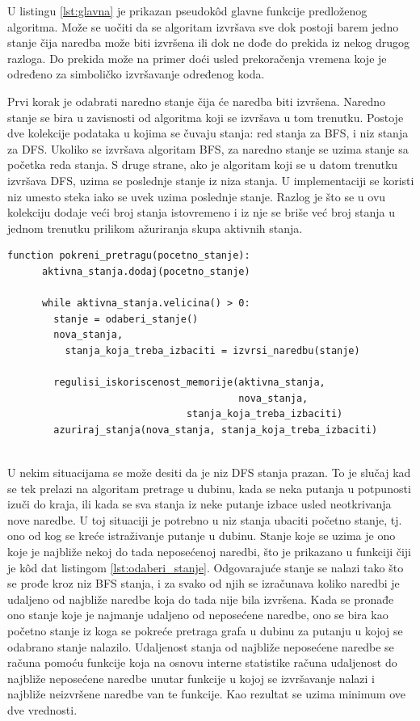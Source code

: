 \documentclass[12pt,oneside]{memoir}
\begin{document}
U listingu \ref{lst:glavna} je prikazan pseudok\^od glavne funkcije predloženog algoritma. Može se uočiti da se algoritam izvršava sve dok postoji barem jedno stanje čija naredba može biti izvršena ili dok ne dođe do prekida iz nekog drugog razloga. Do prekida može na primer doći usled prekoračenja vremena koje je određeno za simboličko izvršavanje određenog koda. 

Prvi korak je odabrati naredno stanje čija će naredba biti izvršena. Naredno stanje se bira u zavisnosti od algoritma koji se izvršava u tom trenutku. Postoje dve kolekcije podataka u kojima se čuvaju stanja: red stanja za BFS, i niz stanja za DFS. Ukoliko se izvršava algoritam BFS, za naredno stanje se uzima stanje sa početka reda stanja. S druge strane, ako je algoritam koji se u datom trenutku izvršava DFS, uzima se poslednje stanje iz niza stanja. U implementaciji se koristi niz umesto steka iako se uvek uzima poslednje stanje. Razlog je što se u ovu kolekciju dodaje veći broj stanja istovremeno i iz nje se briše već broj stanja u jednom trenutku prilikom ažuriranja skupa aktivnih stanja. 

  \begin{lstlisting}[caption={Pseudok\^od glavne funckije algoritma},captionpos=b,label={lst:glavna}]
    function pokreni_pretragu(pocetno_stanje):
      aktivna_stanja.dodaj(pocetno_stanje)
            
      while aktivna_stanja.velicina() > 0:
        stanje = odaberi_stanje()
        nova_stanja, 
          stanja_koja_treba_izbaciti = izvrsi_naredbu(stanje)
                
        regulisi_iskoriscenost_memorije(aktivna_stanja, 
                                        nova_stanja,
                               stanja_koja_treba_izbaciti)
        azuriraj_stanja(nova_stanja, stanja_koja_treba_izbaciti)
            
    \end{lstlisting}

U nekim situacijama se može desiti da je niz DFS stanja prazan. To je slučaj kad se tek prelazi na algoritam pretrage u dubinu, kada se neka putanja u potpunosti izuči do kraja, ili kada se sva stanja iz neke putanje izbace usled neotkrivanja nove naredbe. U toj situaciji je potrebno u niz stanja ubaciti početno stanje, tj. ono od kog se kreće istraživanje putanje u dubinu. Stanje koje se uzima je ono koje je najbliže nekoj do tada neposećenoj naredbi, što je prikazano u funkciji čiji je k\^od dat listingom \ref{lst:odaberi_stanje}. Odgovarajuće stanje se nalazi tako što se prođe kroz niz BFS stanja, i za svako od njih se izračunava koliko naredbi je udaljeno od najbliže naredbe koja do tada nije bila izvršena. Kada se pronađe ono stanje koje je najmanje udaljeno od neposećene naredbe, ono se bira kao početno stanje iz koga se pokreće pretraga grafa u dubinu za putanju u kojoj se odabrano stanje nalazilo. Udaljenost stanja od najbliže neposećene naredbe se računa pomoću funkcije koja na osnovu interne statistike računa udaljenost do najbliže neposećene naredbe unutar funkcije u kojoj se izvršavanje nalazi i najbliže neizvršene naredbe van te funkcije. Kao rezultat se uzima minimum ove dve vrednosti. 
\end{document}
